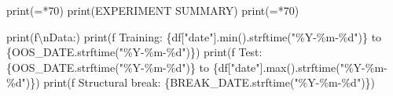 \documentclass[
  letterpaper,
  DIV=11,
  numbers=noendperiod]{scrartcl}
\newenvironment{Shaded}{\begin{snugshade}}{\end{snugshade}}
\newcommand{\BuiltInTok}[1]{\textcolor[rgb]{0.00,0.23,0.31}{#1}}
\newcommand{\CharTok}[1]{\textcolor[rgb]{0.13,0.47,0.30}{#1}}
\newcommand{\DecValTok}[1]{\textcolor[rgb]{0.68,0.00,0.00}{#1}}
\newcommand{\NormalTok}[1]{\textcolor[rgb]{0.00,0.23,0.31}{#1}}
\newcommand{\OperatorTok}[1]{\textcolor[rgb]{0.37,0.37,0.37}{#1}}
\newcommand{\SpecialCharTok}[1]{\textcolor[rgb]{0.37,0.37,0.37}{#1}}
\newcommand{\SpecialStringTok}[1]{\textcolor[rgb]{0.13,0.47,0.30}{#1}}
\newcommand{\StringTok}[1]{\textcolor[rgb]{0.13,0.47,0.30}{#1}}
\begin{document}
\begin{Shaded}
\begin{Highlighting}[]
\BuiltInTok{print}\NormalTok{(}\StringTok{\textquotesingle{}=\textquotesingle{}}\OperatorTok{*}\DecValTok{70}\NormalTok{)}
\BuiltInTok{print}\NormalTok{(}\StringTok{\textquotesingle{}EXPERIMENT SUMMARY\textquotesingle{}}\NormalTok{)}
\BuiltInTok{print}\NormalTok{(}\StringTok{\textquotesingle{}=\textquotesingle{}}\OperatorTok{*}\DecValTok{70}\NormalTok{)}

\BuiltInTok{print}\NormalTok{(}\SpecialStringTok{f\textquotesingle{}}\CharTok{\textbackslash{}n}\SpecialStringTok{Data:\textquotesingle{}}\NormalTok{)}
\BuiltInTok{print}\NormalTok{(}\SpecialStringTok{f\textquotesingle{}  Training: }\SpecialCharTok{\{}\NormalTok{df[}\StringTok{"date"}\NormalTok{]}\SpecialCharTok{.}\BuiltInTok{min}\NormalTok{()}\SpecialCharTok{.}\NormalTok{strftime(}\StringTok{"\%Y{-}\%m{-}}\SpecialCharTok{\%d}\StringTok{"}\NormalTok{)}\SpecialCharTok{\}}\SpecialStringTok{ to }\SpecialCharTok{\{}\NormalTok{OOS\_DATE}\SpecialCharTok{.}\NormalTok{strftime(}\StringTok{"\%Y{-}\%m{-}}\SpecialCharTok{\%d}\StringTok{"}\NormalTok{)}\SpecialCharTok{\}}\SpecialStringTok{\textquotesingle{}}\NormalTok{)}
\BuiltInTok{print}\NormalTok{(}\SpecialStringTok{f\textquotesingle{}  Test: }\SpecialCharTok{\{}\NormalTok{OOS\_DATE}\SpecialCharTok{.}\NormalTok{strftime(}\StringTok{"\%Y{-}\%m{-}}\SpecialCharTok{\%d}\StringTok{"}\NormalTok{)}\SpecialCharTok{\}}\SpecialStringTok{ to }\SpecialCharTok{\{}\NormalTok{df[}\StringTok{"date"}\NormalTok{]}\SpecialCharTok{.}\BuiltInTok{max}\NormalTok{()}\SpecialCharTok{.}\NormalTok{strftime(}\StringTok{"\%Y{-}\%m{-}}\SpecialCharTok{\%d}\StringTok{"}\NormalTok{)}\SpecialCharTok{\}}\SpecialStringTok{\textquotesingle{}}\NormalTok{)}
\BuiltInTok{print}\NormalTok{(}\SpecialStringTok{f\textquotesingle{}  Structural break: }\SpecialCharTok{\{}\NormalTok{BREAK\_DATE}\SpecialCharTok{.}\NormalTok{strftime(}\StringTok{"\%Y{-}\%m{-}}\SpecialCharTok{\%d}\StringTok{"}\NormalTok{)}\SpecialCharTok{\}}\SpecialStringTok{\textquotesingle{}}\NormalTok{)}


\end{Highlighting}
\end{Shaded}
\end{document}

